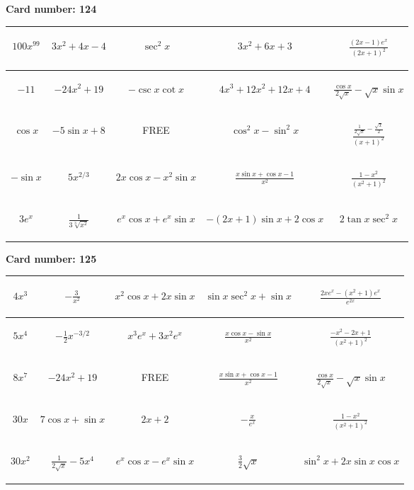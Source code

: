 \documentclass{article}
\newcommand{\entry}[1]{\begin{minipage}[t][2.75cm][t]{4cm} \vspace{1cm} \begin{center}#1\end{center} \end{minipage}}
\newcommand{\freespace}{\entry{FREE}}
\newcommand{\cardnumber}[1]{\noindent \textbf{Card number: #1} \bigskip}
\begin{document}
\pagebreak

\cardnumber{124}
\begin{center}
\begin{tabular}{|*{5}{c|}}
    \hline
    \entry{$100x^{99}$} & \entry{$3x^2 + 4x - 4$} & \entry{$\sec^2 x$} & \entry{$3x^2 + 6x + 3$} & \entry{$\frac{(2x - 1) e^x}{(2x + 1)^2}$} \\ \hline
    \entry{$-11$} & \entry{$-24x^2 + 19$} & \entry{$-\csc x \cot x$} & \entry{$4x^3 + 12x^2 + 12x + 4$} & \entry{$\frac{\cos x}{2 \sqrt{x}} - \sqrt{x} \sin x$} \\ \hline
    \entry{$\cos x$} & \entry{$-5 \sin x + 8$} & \freespace & \entry{$\cos^2 x - \sin^2 x$} & \entry{$\frac{\frac{1}{2 \sqrt{x}} - \frac{\sqrt{x}}{2}}{(x + 1)^2}$} \\ \hline
    \entry{$-\sin x$} & \entry{$5x^{2/3}$} & \entry{$2x \cos x - x^2 \sin x$} & \entry{$\frac{x \sin x + \cos x - 1}{x^2}$} & \entry{$\frac{1 - x^2}{(x^2 + 1)^2}$} \\ \hline
    \entry{$3e^x$} & \entry{$\frac{1}{3\sqrt[3]{x^2}}$} & \entry{$e^x \cos x + e^x \sin x$} & \entry{$-(2x + 1) \sin x + 2 \cos x$} & \entry{$2 \tan x \sec^2 x$} \\ \hline
\end{tabular}
\end{center}

\pagebreak

\cardnumber{125}
\begin{center}
\begin{tabular}{|*{5}{c|}}
    \hline
    \entry{$4x^3$} & \entry{$-\frac{3}{x^2}$} & \entry{$x^2 \cos x + 2x \sin x$} & \entry{$\sin x \sec^2 x + \sin x$} & \entry{$\frac{2x e^x - (x^2 + 1) e^x}{e^{2x}}$} \\ \hline
    \entry{$5x^4$} & \entry{$-\frac{1}{2} x^{-3/2}$} & \entry{$x^3 e^x + 3x^2 e^x$} & \entry{$\frac{x \cos x - \sin x}{x^2}$} & \entry{$\frac{-x^2 - 2x + 1}{(x^2 + 1)^2}$} \\ \hline
    \entry{$8x^7$} & \entry{$-24x^2 + 19$} & \freespace & \entry{$\frac{x \sin x + \cos x - 1}{x^2}$} & \entry{$\frac{\cos x}{2 \sqrt{x}} - \sqrt{x} \sin x$} \\ \hline
    \entry{$30x$} & \entry{$7 \cos x + \sin x$} & \entry{$2x + 2$} & \entry{$-\frac{x}{e^x}$} & \entry{$\frac{1 - x^2}{(x^2 + 1)^2}$} \\ \hline
    \entry{$30x^2$} & \entry{$\frac{1}{2\sqrt{x}} - 5x^4$} & \entry{$e^x \cos x - e^x \sin x$} & \entry{$\frac{3}{2} \sqrt{x}$} & \entry{$\sin^2 x + 2x \sin x \cos x$} \\ \hline
\end{tabular}
\end{center}
\end{document}
